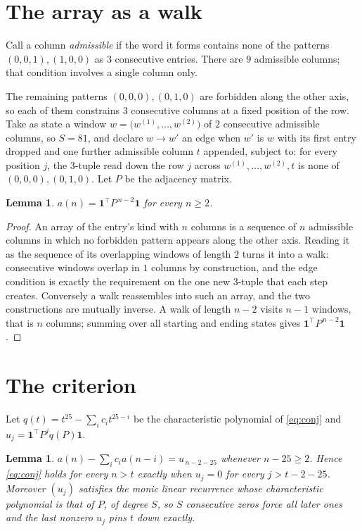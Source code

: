 \documentclass[11pt,a4paper]{article}
\theoremstyle{plain}
\newtheorem{lemma}[theorem]{Lemma}
\theoremstyle{definition}
\begin{document}
\section{The array as a walk}

Call a column \emph{admissible} if the word it forms contains none of the patterns
$(0,0,1), (1,0,0)$ as $3$ consecutive entries. There are $9$ admissible columns; that condition
involves a single column only.

The remaining patterns $(0,0,0), (0,1,0)$ are forbidden along the other axis, so each of them
constrains $3$ consecutive columns at a fixed position of the row. Take as state a
window $w=\bigl(w^{(1)},\dots,w^{(2)}\bigr)$ of $2$ consecutive admissible
columns, so $S=81$, and declare $w\to w'$ an edge when $w'$ is $w$ with its first entry
dropped and one further admissible column $t$ appended, subject to: for every position
$j$, the $3$-tuple read down the row $j$ across $w^{(1)},\dots,w^{(2)},t$
is none of $(0,0,0), (0,1,0)$. Let $P$ be the adjacency matrix.

\begin{lemma}\label{lem:walk}
$a(n)=\mathbf{1}^{\!\top}P^{\,n-2}\mathbf{1}$ for every $n\ge2$.
\end{lemma}

\begin{proof}
An array of the entry's kind with $n$ columns is a sequence of $n$ admissible columns in
which no forbidden pattern appears along the other axis. Reading it as the sequence of its
overlapping windows of length $2$ turns it into a walk: consecutive windows overlap in
$1$ columns by construction, and the edge condition is exactly the requirement on the one
new $3$-tuple that each step creates. Conversely a walk reassembles into such an array,
and the two constructions are mutually inverse. A walk of length $n-2$ visits $n-1$
windows, that is $n$ columns; summing over all starting and ending states gives
$\mathbf{1}^{\!\top}P^{\,n-2}\mathbf{1}$.
\end{proof}

\section{The criterion}

Let $q(t)=t^{25}-\sum_i c_i t^{25-i}$ be the characteristic polynomial of
\eqref{eq:conj} and $u_j=\mathbf{1}^{\!\top}P^{j}q(P)\mathbf{1}$.

\begin{lemma}\label{lem:crit}
$a(n)-\sum_i c_i a(n-i)=u_{\,n-2-25}$ whenever $n-25\ge2$. Hence
\eqref{eq:conj} holds for every $n>t$ exactly when $u_j=0$ for every
$j>t-2-25$. Moreover $(u_j)$ satisfies the monic linear recurrence whose
characteristic polynomial is that of $P$, of degree $S$, so $S$ consecutive zeros force all
later ones and the last nonzero $u_j$ pins $t$ down exactly.
\end{lemma}
\end{document}

